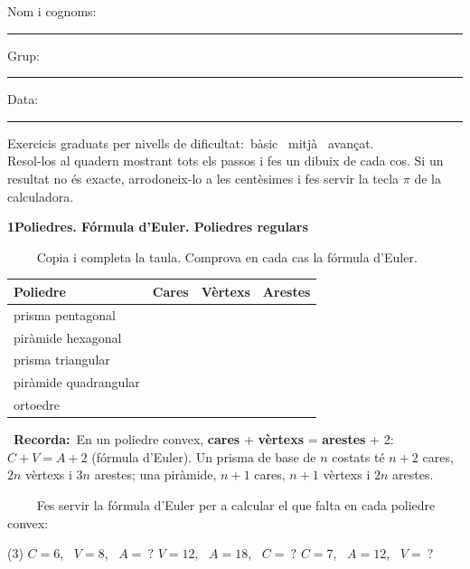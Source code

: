 \documentclass[11pt,a4paper]{article}
\newcommand{\estrelles}[1]{{\color{accent}\ifcase#1\or\faStar\faStar[regular]\faStar[regular]\or\faStar\faStar\faStar[regular]\or\faStar\faStar\faStar\fi}}
\newcounter{exer}
\newcommand{\ex}[1]{\par\needspace{4\baselineskip}\medskip\stepcounter{exer}\noindent{\color{navy}\bfseries\theexer.}\ \ {\small\estrelles{#1}}\ \ }
\newcommand{\seccio}[2]{\par\needspace{10\baselineskip}\bigskip
  \begin{tcolorbox}[colback=navy,colframe=navy,coltext=white,arc=2mm,boxrule=0pt,left=3mm,right=3mm,top=1.2mm,bottom=1.2mm]
  {\large\bfseries #1\quad #2}
  \end{tcolorbox}\vspace{-2pt}}
\newcommand{\recorda}[1]{\par\smallskip\begin{tcolorbox}[colback=accent!7,colframe=accent!55,arc=2mm,boxrule=0.5pt,left=2.5mm,right=2.5mm,top=1mm,bottom=1mm]\small{\color{accent}\faLightbulb[regular]}\ \textbf{Recorda:}\ #1\end{tcolorbox}}
\begin{document}
\thispagestyle{primera}

\vspace{10pt}
Nom i cognoms: \rule{8.4cm}{0.4pt}\hfill Grup: \rule{1.6cm}{0.4pt}\hfill Data: \rule{2.2cm}{0.4pt}
\vspace{8pt}

\begin{tcolorbox}[colback=soft,colframe=soft,arc=2mm,left=3mm,right=3mm,top=1.5mm,bottom=1.5mm]
\small Exercicis graduats per nivells de dificultat:\quad \estrelles{1}\ bàsic \qquad \estrelles{2}\ mitjà \qquad \estrelles{3}\ avançat.\\[2pt] Resol-los al quadern mostrant tots els passos i fes un dibuix de cada cos. Si un resultat no és exacte, arrodoneix-lo a les centèsimes i fes servir la tecla $\pi$ de la calculadora.
\end{tcolorbox}

\seccio{1}{Poliedres. Fórmula d'Euler. Poliedres regulars}

\ex{1} Copia i completa la taula. Comprova en cada cas la fórmula d'Euler.\par\smallskip\begin{center}\renewcommand{\arraystretch}{1.25}\begin{tabular}{|l|C{1.6cm}|C{1.6cm}|C{1.6cm}|}\hline Poliedre & Cares & Vèrtexs & Arestes \\\hline prisma pentagonal & & &  \\\hline piràmide hexagonal & & &  \\\hline prisma triangular & & &  \\\hline piràmide quadrangular & & &  \\\hline ortoedre & & &  \\\hline\end{tabular}\end{center}\recorda{En un poliedre convex, \textbf{cares} + \textbf{vèrtexs} = \textbf{arestes} + 2: \ $C+V=A+2$ (fórmula d'Euler). Un prisma de base de $n$ costats té $n+2$ cares, $2n$ vèrtexs i $3n$ arestes; una piràmide, $n+1$ cares, $n+1$ vèrtexs i $2n$ arestes.}

\ex{1} Fes servir la fórmula d'Euler per a calcular el que falta en cada poliedre convex:\begin{tasks}(3)
  \task $C=6$, \ $V=8$, \ $A=\ ?$
  \task $V=12$, \ $A=18$, \ $C=\ ?$
  \task $C=7$, \ $A=12$, \ $V=\ ?$
\end{tasks}
\end{document}
